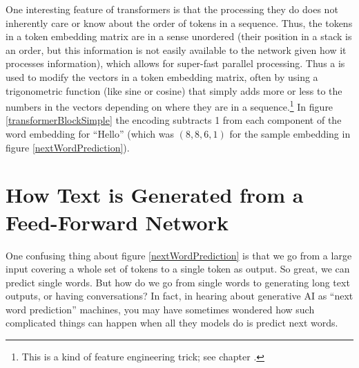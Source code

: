 One interesting feature of transformers is that the processing they do does not inherently care or know about the order of tokens in a sequence. Thus, the tokens in a token embedding matrix are in a sense unordered (their position in a stack is an order, but this information is not easily available to the network given how it processes information), which allows for super-fast parallel processing. Thus a  is used to modify the vectors in a token embedding matrix, often by using a trigonometric function (like sine or cosine) that simply adds more or less to the numbers in the vectors depending on where they are in a sequence.\footnote{This is a kind of feature engineering trick; see chapter .}  In figure \ref{transformerBlockSimple} the encoding subtracts 1 from each component of the word embedding for ``Hello'' (which was $(8,8,6,1)$ for the sample embedding in figure \ref{nextWordPrediction}).
  
\section{How Text is Generated from a Feed-Forward Network}


One confusing thing about figure \ref{nextWordPrediction} is that we go from a large input covering a whole set of tokens to a single token as output. So great, we can predict single words. But how do we go from single words to generating long text outputs, or having conversations? In fact, in hearing about generative AI as ``next word prediction'' machines, you may have sometimes wondered how such complicated things can happen when all they models do is predict next words.

